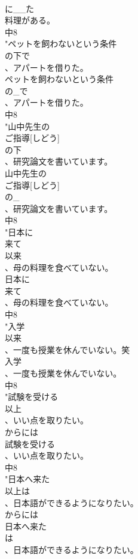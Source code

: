 \documentclass[8pt]{extreport}
\begin{document}
\begin{CJK}{UTF8}{min}
\\	に__た
\\	料理がある。
\\	中8
\\	"ペットを飼わないという条件
\\	の下で
\\	、アパートを借りた。
\\	ペットを飼わないという条件
\\	の_で
\\	、アパートを借りた。
\\	中8
\\	"山中先生の
\\	ご指導[しどう]
\\	の下
\\	、研究論文を書いています。
\\	山中先生の
\\	ご指導[しどう]
\\	の_
\\	、研究論文を書いています。
\\	中8
\\	"日本に
\\	来て
\\	以来
\\	、母の料理を食べていない。
\\	日本に
\\	来て
\\	、母の料理を食べていない。
\\	中8
\\	"入学
\\	以来
\\	、一度も授業を休んでいない。笑
\\	入学
\\	、一度も授業を休んでいない。
\\	中8
\\	"試験を受ける
\\	以上
\\	、いい点を取りたい。 
\\	からには
\\	試験を受ける
\\	、いい点を取りたい。
\\	中8
\\	"日本へ来た
\\	以上は
\\	、日本語ができるようになりたい。 
\\	からには
\\	日本へ来た
\\	は
\\	、日本語ができるようになりたい。

\end{CJK}
\end{document}
